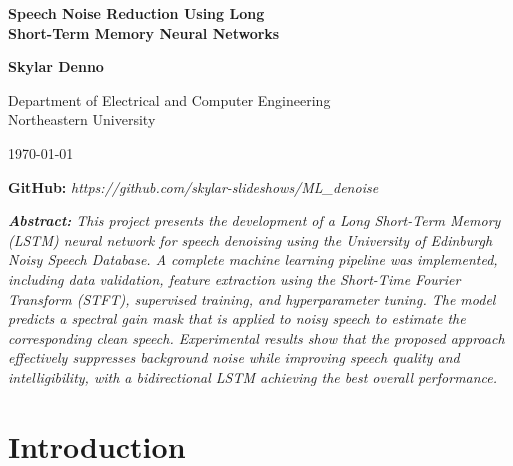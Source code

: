 \documentclass[11pt, letterpaper,titlepage]{article}
\begin{document}
\begin{titlepage}
    \centering
    \vspace*{0cm}
    
    {\Huge \textbf{Speech Noise Reduction Using Long \\ \vspace{0.5cm}Short-Term Memory Neural Networks}} \\[1cm]
    
    \vspace{7cm}
    
    




    
    \vspace{1cm}
    {\Large \textbf{Skylar Denno}}
    

    
    \vspace{0.8cm}

    
    Department of Electrical and Computer Engineering \\
    Northeastern University \\
    \vspace{0.8cm}
    
    
    \today
    
        \vspace{0.8cm}
        
        \textbf{GitHub:} \textit{https://github.com/skylar-slideshows/ML\_denoise}
        \vspace{0.8cm}
        
        \justify
            \textit{\textbf{Abstract:} This project presents the development of a Long Short-Term Memory (LSTM) neural network for speech denoising using the University of Edinburgh Noisy Speech Database. A complete machine learning pipeline was implemented, including data validation, feature extraction using the Short-Time Fourier Transform (STFT), supervised training, and hyperparameter tuning. The model predicts a spectral gain mask that is applied to noisy speech to estimate the corresponding clean speech. Experimental results show that the proposed approach effectively suppresses background noise while improving speech quality and intelligibility, with a bidirectional LSTM achieving the best overall performance.}
    
\end{titlepage}

\justify

\section{Introduction}
\end{document}
